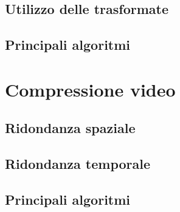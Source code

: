 \subsection{Utilizzo delle trasformate}


\subsection{Principali algoritmi}


\section{Compressione video}


\subsection{Ridondanza spaziale}


\subsection{Ridondanza temporale}


\subsection{Principali algoritmi}

